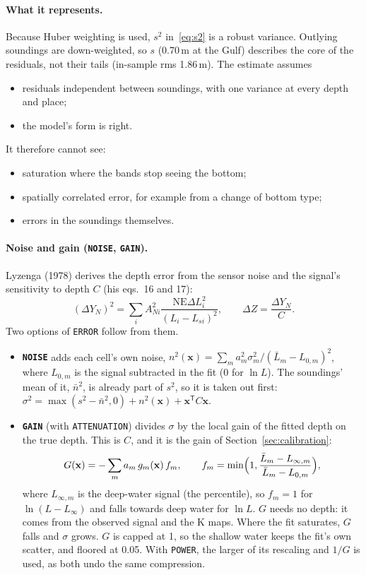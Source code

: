 \documentclass[11pt]{article}
\numberwithin{equation}{section}
\newcommand{\bx}{\mathbf{x}}
\newcommand{\code}[1]{\texttt{#1}}
\begin{document}
\paragraph{What it represents.} Because Huber weighting is used, $s^2$ in~\eqref{eq:s2} is a robust
variance. Outlying soundings are down-weighted, so $s$ (0.70\,m at the Gulf) describes the core
of the residuals, not their tails (in-sample rms 1.86\,m). The estimate assumes
\begin{itemize}
\item residuals independent between soundings, with one variance at every depth and place;
\item the model's form is right.
\end{itemize}
It therefore cannot see:
\begin{itemize}
\item saturation where the bands stop seeing the bottom;
\item spatially correlated error, for example from a change of bottom type;
\item errors in the soundings themselves.
\end{itemize}

\paragraph{Noise and gain (\code{NOISE}, \code{GAIN}).} Lyzenga (1978) derives the depth error from
the sensor noise and the signal's sensitivity to depth $C$ (his eqs.~16 and 17):
\begin{equation}
  (\Delta Y_N)^2 = \sum_i A_{Ni}^2 \frac{\mathrm{NE}\Delta L_i^2}{(L_i - L_{si})^2}, \qquad
  \Delta Z = \frac{\Delta Y_N}{C} .
\end{equation}
Two options of \code{ERROR} follow from them.
\begin{itemize}
\item \textbf{\code{NOISE}} adds each cell's own noise,
  $n^2(\bx) = \sum_m a_m^2 \sigma_m^2/(\bar L_m - L_{0,m})^2$, where $L_{0,m}$ is the signal
  subtracted in the fit (0 for $\ln L$). The soundings' mean of it,
  $\bar n^2$, is already part of $s^2$, so it is taken out first:
  $\sigma^2 = \max(s^2 - \bar n^2, 0) + n^2(\bx) + \mathbf{x}^{\mathsf T} C\mathbf{x}$.
\item \textbf{\code{GAIN}} (with \code{ATTENUATION}) divides $\sigma$ by the local gain of the
  fitted depth on the true depth. This is $C$, and it is the gain of Section~\ref{sec:calibration}:
  \begin{equation}
    G(\bx) = -\sum_m a_m\, g_m(\bx)\, f_m, \qquad
    f_m = \min\Bigl(1, \frac{\bar L_m - L_{\infty,m}}{\bar L_m - L_{0,m}}\Bigr) ,
  \end{equation}
  where $L_{\infty,m}$ is the deep-water signal (the percentile), so $f_m = 1$ for
  $\ln(L - L_\infty)$ and falls towards deep water for $\ln L$. $G$ needs no depth: it comes from the observed signal and the K maps.
  Where the fit saturates, $G$ falls and $\sigma$ grows. $G$ is capped at 1, so the shallow water
  keeps the fit's own scatter, and floored at 0.05. With \code{POWER}, the larger of its rescaling
  and $1/G$ is used, as both undo the same compression.
\end{itemize}
\end{document}

